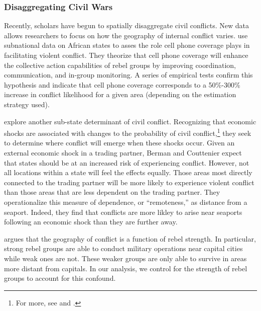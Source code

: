 \subsubsection{Disaggregating Civil Wars}

Recently, scholars have begun to spatially disaggregate civil conflicts.  New data allows researchers to focus on how the geography of internal conflict varies.  \cite{pierskalla:hollenbach:2013} use subnational data on African states to asses the role cell phone coverage plays in facilitating violent conflict.  They theorize that cell phone coverage will enhance the collective action capabilities of rebel groups by improving coordination, communication, and in-group monitoring.  A series of empirical tests confirm this hypothesis and indicate that cell phone coverage corresponds to a 50\%-300\% increase in conflict likelihood for a given area (depending on the estimation strategy used).

\cite{berman:couttenier:2013} explore another sub-state determinant of civil conflict.  Recognizing that economic shocks are associated with changes to the probability of civil conflict,\footnote{For more, see \cite{miguel:etal:2004} and \cite{dube:vargas:2013}.} they seek to determine where conflict will emerge when these shocks occur.  Given an external economic shock in a trading partner, Berman and Couttenier expect that states should be at an increased risk of experiencing conflict.  However, not all locations within a state will feel the effects equally.  Those areas most directly connected to the trading partner will be more likely to experience violent conflict than those areas that are less dependent on the trading partner.  They operationalize this measure of dependence, or ``remoteness,'' as distance from a seaport.  Indeed, they find that conflicts are more likley to arise near seaports following an economic shock than they are further away.

\cite{buhaug:2010} argues that the geography of conflict is a function of rebel strength.  In particular, strong rebel groups are able to conduct military operations near capital cities while weak ones are not.  These weaker groups are only able to survive in areas more distant from capitals. In our analysis, we control for the strength of rebel groups to account for this confound.
